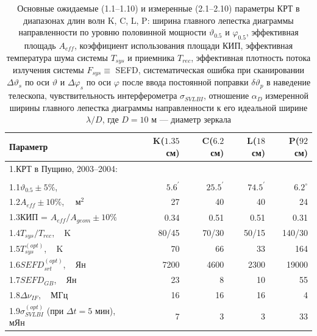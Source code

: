 \begin{table}
\caption{Основные ожидаемые (1.1--1.10) и измеренные
(2.1--2.10) параметры КРТ в диапазонах длин волн K, C, L, P:
ширина главного лепестка диаграммы направленности по уровню
половинной мощности $\vartheta_{0.5}$ и $\varphi_{0.5}$,
эффективная площадь $A_{eff}$,
коэффициент использования площади КИП,
эффективная температура шума системы $T_{sys}$ и приемника
$T_{rec}$,
эффективная плотность потока излучения системы $F_{sys} \equiv$ SEFD,
систематическая ошибка при сканировании  $\Delta \vartheta_s$
по оси $\vartheta$ и $\Delta \varphi_s$ по оси $\varphi$
после ввода постоянной поправки $\delta \vartheta_p$ в
наведение телескопа,
чувствительность интерферометра $\sigma_{SVLBI}$,
отношение $\alpha_{D}$
измеренной ширины главного лепестка диаграммы направленности к его
идеальной ширине $\lambda / D$, где $D = 10$ м --- диаметр зеркала}
\bigskip
\label{tab:srt_params1}
\centering
    \begin{SingleSpace}
        \begin{tabular}{l|r|r|r|r}
        \toprule
        Параметр              &K($1.35$ см)&C($6.2$ см)&L($18$ см)&P($92$ см)\\
        \midrule
1.\quad  КРТ в Пущино, 2003--2004:& & & &\\
                                  & & & &\\
1.1\quad $\vartheta_{0.5} \pm 5\%$, \,\,\,\,\,\,\,\,\,
&  $5.6^\prime$ & $25.5^\prime$  & $74.5^\prime$ & $6.2^\circ$ \\
1.2\quad  $A_{eff} \pm 10\%$, \,\,\,\,  м$^2$     &   27 &   40 &   40 &  24\\
1.3\quad  КИП = $A_{eff}/A_{geom} \pm 10\%$ & 0.34 & 0.51 & 0.51 & 0.31\\
1.4\quad  $T_{sys}/T_{rec}$, \,\,\, K                                   &80/45 & 70/30 & 50/15
&140/30\\
1.5\quad  $T_{sys}^{(opt)}$, \,\,\, K                                    &70    & 66    &  33  &
164\\
1.6\quad  $SEFD_{srt}^{(opt)}$, \,\,\, Ян                                        &7200    &4600
&2300  &19000\\
1.7\quad  $SEFD_{GB}$, \,\,\, Ян                                         & 23     & 8     & 10   &
55\\
1.8\quad  $\Delta \nu_{IF}$, \,\,\, МГц                                   & 16     & 16    & 16   &
4\\
1.9\quad  $\sigma_{SVLBI}^{(opt)}$ (при $\Delta t = 5$ мин), \,\,\, мЯн  & 7   & 3   & 3   & 33\\

\end{tabular}
\end{SingleSpace}
\end{table}
